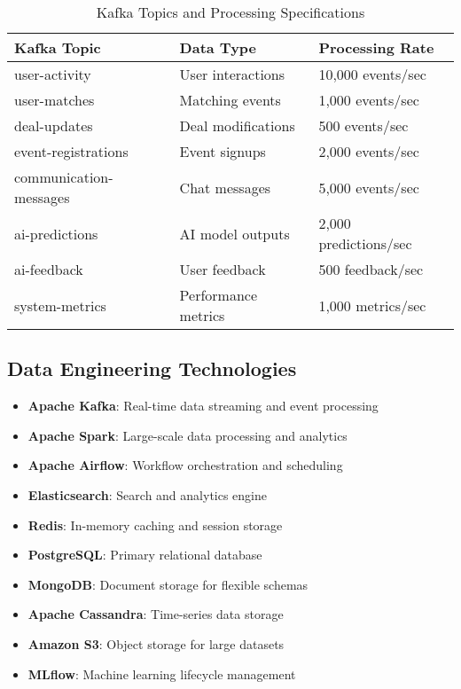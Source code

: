 \begin{table}[h]
\centering
\begin{tabular}{|l|l|l|}
\hline
\textbf{Kafka Topic} & \textbf{Data Type} & \textbf{Processing Rate} \\
\hline
user-activity & User interactions & 10,000 events/sec \\
user-matches & Matching events & 1,000 events/sec \\
deal-updates & Deal modifications & 500 events/sec \\
event-registrations & Event signups & 2,000 events/sec \\
communication-messages & Chat messages & 5,000 events/sec \\
ai-predictions & AI model outputs & 2,000 predictions/sec \\
ai-feedback & User feedback & 500 feedback/sec \\
system-metrics & Performance metrics & 1,000 metrics/sec \\
\hline
\end{tabular}
\caption{Kafka Topics and Processing Specifications}
\label{tab:kafka-topics}
\end{table}

\subsection{Data Engineering Technologies}

\begin{itemize}
    \item \textbf{Apache Kafka}: Real-time data streaming and event processing
    \item \textbf{Apache Spark}: Large-scale data processing and analytics
    \item \textbf{Apache Airflow}: Workflow orchestration and scheduling
    \item \textbf{Elasticsearch}: Search and analytics engine
    \item \textbf{Redis}: In-memory caching and session storage
    \item \textbf{PostgreSQL}: Primary relational database
    \item \textbf{MongoDB}: Document storage for flexible schemas
    \item \textbf{Apache Cassandra}: Time-series data storage
    \item \textbf{Amazon S3}: Object storage for large datasets
    \item \textbf{MLflow}: Machine learning lifecycle management
\end{itemize}

